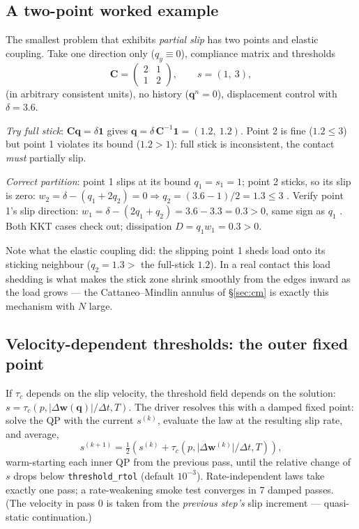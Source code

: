 \documentclass[11pt,a4paper]{article}
\newcommand{\bq}{\mathbf{q}}
\newcommand{\bw}{\mathbf{w}}
\newcommand{\bC}{\mathbf{C}}
\newcommand{\abs}[1]{\lvert#1\rvert}
\newcommand{\code}[1]{\texttt{#1}}
\begin{document}
\subsection{A two-point worked example}
\label{sec:toy2}

The smallest problem that exhibits \emph{partial slip} has two points and
elastic coupling. Take one direction only ($q_y \equiv 0$), compliance
matrix and thresholds
\begin{equation}
  \bC = \begin{pmatrix} 2 & 1 \\ 1 & 2 \end{pmatrix},
  \qquad s = (1,\ 3),
\end{equation}
(in arbitrary consistent units), no history ($\bq^n = 0$), displacement
control with $\delta = 3.6$.

\emph{Try full stick}: $\bC \bq = \delta \mathbf 1$ gives
$\bq = \delta\,\bC^{-1}\mathbf 1 = (1.2,\ 1.2)$. Point 2 is fine
($1.2 \le 3$) but point 1 violates its bound ($1.2 > 1$): full stick is
inconsistent, the contact \emph{must} partially slip.

\emph{Correct partition}: point 1 slips at its bound $q_1 = s_1 = 1$;
point 2 sticks, so its slip is zero:
$w_2 = \delta - (q_1 + 2 q_2) = 0 \Rightarrow q_2 = (3.6 - 1)/2 = 1.3 \le 3$
\checkmark. Verify point 1's slip direction:
$w_1 = \delta - (2 q_1 + q_2) = 3.6 - 3.3 = 0.3 > 0$, same sign as $q_1$
\checkmark. Both KKT cases check out; dissipation
$D = q_1 w_1 = 0.3 > 0$.

Note what the elastic coupling did: the slipping point 1 sheds load onto its
sticking neighbour ($q_2 = 1.3 >$ the full-stick $1.2$). In a real contact
this load shedding is what makes the stick zone shrink smoothly from the
edges inward as the load grows --- the Cattaneo--Mindlin annulus of
\S\ref{sec:cm} is exactly this mechanism with $N$ large.

\subsection{Velocity-dependent thresholds: the outer fixed point}
\label{sec:threshold-loop}

If $\tau_c$ depends on the slip velocity, the threshold field depends on the
solution: $s = \tau_c(p, \abs{\Delta\bw(\bq)}/\Delta t, T)$. The driver
resolves this with a damped fixed point: solve the QP with the current
$s^{(k)}$, evaluate the law at the resulting slip rate, and average,
\begin{equation}
  s^{(k+1)} = \tfrac12\left( s^{(k)}
            + \tau_c\!\left(p, \abs{\Delta\bw^{(k)}}/\Delta t, T\right)\right),
\end{equation}
warm-starting each inner QP from the previous pass, until the relative
change of $s$ drops below \code{threshold\_rtol} (default $10^{-3}$).
Rate-independent laws take exactly one pass; a rate-weakening smoke test
converges in 7 damped passes. (The velocity in pass 0 is taken from the
\emph{previous step's} slip increment --- quasi-static continuation.)
\end{document}
